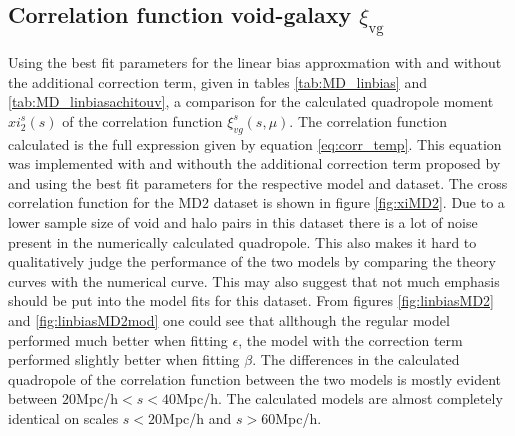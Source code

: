\subsection{Correlation function void-galaxy $\xi_{\mathrm{vg}}$}
Using the best fit parameters for the linear bias approxmation with and without the additional correction term, given in tables \ref{tab:MD_linbias} and \ref{tab:MD_linbiasachitouv}, a comparison for the calculated quadropole moment $xi_2^s(s)$ of the correlation function $\xi_{vg}^s(s,\mu)$. The correlation function calculated is the full expression given by equation \ref{eq:corr_temp}. This equation was implemented with and withouth the additional correction term proposed by \cite{Achitouv_streaming} and using the best fit parameters for the respective model and dataset. The cross correlation function for the MD2 dataset is shown in figure \ref{fig:xiMD2}. Due to a lower sample size of void and halo pairs in this dataset there is a lot of noise present in the numerically calculated quadropole. This also makes it hard to qualitatively judge the performance of the two models by comparing the theory curves with the numerical curve. This may also suggest that not much emphasis should be put into the model fits for this dataset. From figures \ref{fig:linbiasMD2} and \ref{fig:linbiasMD2mod} one could see that allthough the regular model performed much better when fitting $\epsilon$, the model with the correction term performed slightly better when fitting $\beta$. The differences in the calculated quadropole of the correlation function between the two models is mostly evident between $20$Mpc/h$<s<40$Mpc/h. The calculated models are almost completely identical on scales $s<20$Mpc/h and $s>60$Mpc/h.\\\indent
